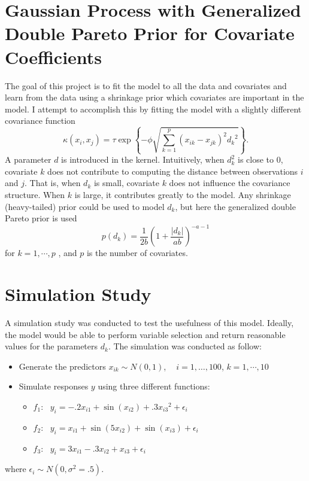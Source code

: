 \documentclass[11pt]{article}
\newcommand{\p}[1]{\left(#1\right)}
\newcommand{\bc}[1]{ \left\{#1\right\} }
\newcommand{\abs}[1]{ \left|#1\right| }
\begin{document}
\section{Gaussian Process with Generalized Double Pareto Prior for Covariate Coefficients}
The goal of this project is to fit the model to all the data and covariates and
learn from the data using a shrinkage prior which covariates are important in
the model. I attempt to accomplish this by fitting the model with a slightly
different covariance function
\[
  \kappa(x_i,x_j) = \tau \exp\bc{-\phi\sqrt{\sum_{k=1}^p (x_{ik}-x_{jk})^2{d_k}^2}}.
\]
A parameter $d$ is introduced in the kernel. Intuitively, when $d_k^2$ is close
to 0, covariate $k$ does not contribute to computing the distance between
observations $i$ and $j$. That is, when $d_k$ is small, covariate $k$ does not
influence the covariance structure. When $k$ is large, it contributes greatly
to the model. Any shrinkage (heavy-tailed) prior could be used to model $d_k$,
but here the generalized double Pareto prior is used
\[
  p(d_k) =  \frac{1}{2b}\p{1 + \frac{\abs{d_k}}{ab}}^{-a-1}
\]
for $k=1,\cdots,p$ , and $p$ is the number of covariates.


\section{Simulation Study}
A simulation study was conducted to test the usefulness of this model.
Ideally, the model would be able to perform variable selection and 
return reasonable values for the parameters $d_k$. The simulation 
was conducted as follow:

\begin{itemize}
  \item Generate the predictors $x_{ik} \sim N(0,1)$, $~~~~i=1,\dots,100$, $k=1,\cdots,10$
  \item Simulate responses $y$ using three different functions:
    \begin{itemize}
      \item[] $f_1$:~ $y_i =-.2x_{i1} + \sin(x_{i2})  + .3{x_{i3}}^2 + \epsilon_i$
      \item[] $f_2$:~ $y_i =x_{i1}    + \sin(5x_{i2}) + \sin(x_{i3}) + \epsilon_i$
      \item[] $f_3$:~ $y_i =3x_{i1}   - .3x_{i2}      + x_{i3}       + \epsilon_i$
    \end{itemize}
\end{itemize}
where $\epsilon_i \sim N(0,\sigma^2=.5)$.\\
\end{document}
